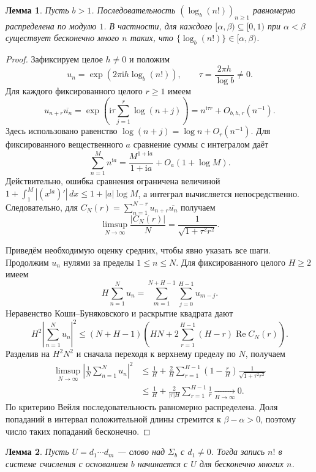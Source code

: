 \documentclass[a4paper,14pt]{extreport}
\theoremstyle{plain}
\newtheorem{lemma}{Лемма}[section]
\theoremstyle{definition}
\theoremstyle{remark}
\begin{document}
\begin{lemma}\label{lem:logfact}
Пусть $b>1$. Последовательность $(\log_b(n!))_{n\ge1}$
равномерно распределена по модулю $1$. В частности, для каждого
$[\alpha,\beta)\subseteq[0,1)$ при $\alpha<\beta$ существует
бесконечно много $n$ таких, что
$\{\log_b(n!)\}\in[\alpha,\beta)$.
\end{lemma}
\begin{proof}
Зафиксируем целое $h\ne0$ и положим
\[
 u_n=\exp(2\pi\mathrm i h\log_b(n!)),\qquad
 \tau=\frac{2\pi h}{\log b}\ne0.
\]
Для каждого фиксированного целого $r\ge1$ имеем
\[
 u_{n+r}\overline{u_n}
 =\exp\left(\mathrm i\tau\sum_{j=1}^r\log(n+j)\right)
 =n^{\mathrm i\tau r}+O_{b,h,r}(n^{-1}).
\]
Здесь использовано равенство
$\log(n+j)=\log n+O_r(n^{-1})$.
Для фиксированного вещественного $a$ сравнение суммы с интегралом даёт
\[
 \sum_{n=1}^M n^{\mathrm i a}
 =\frac{M^{1+\mathrm i a}}{1+\mathrm i a}+O_a(1+\log M).
\]
Действительно, ошибка сравнения ограничена величиной
$1+\int_1^M |(x^{\mathrm i a})'|\,dx
\le1+|a|\log M$, а интеграл вычисляется непосредственно.
Следовательно, для
$C_N(r)=\sum_{n=1}^{N-r}u_{n+r}\overline{u_n}$ получаем
\[
 \limsup_{N\to\infty}\frac{|C_N(r)|}{N}
 =\frac1{\sqrt{1+\tau^2r^2}}.
\]

Приведём необходимую оценку средних, чтобы явно указать все шаги.
Продолжим $u_n$ нулями за пределы $1\le n\le N$.
Для фиксированного целого $H\ge2$ имеем
\[
 H\sum_{n=1}^N u_n
 =\sum_{m=1}^{N+H-1}\sum_{j=0}^{H-1}u_{m-j}.
\]
Неравенство Коши--Буняковского и раскрытие квадрата дают
\[
 H^2\left|\sum_{n=1}^N u_n\right|^2
 \le (N+H-1)\left(
 HN+2\sum_{r=1}^{H-1}(H-r)\operatorname{Re}C_N(r)\right).
\]
Разделив на $H^2N^2$ и сначала переходя к верхнему пределу по $N$,
получаем
\[
\begin{aligned}
 \limsup_{N\to\infty}
 \left|\frac1N\sum_{n=1}^N u_n\right|^2
 &\le \frac1H+
 \frac2H\sum_{r=1}^{H-1}
 \left(1-\frac rH\right)\frac1{\sqrt{1+\tau^2r^2}}\\
 &\le \frac1H+\frac{2}{|\tau|H}\sum_{r=1}^{H-1}\frac1r
 \xrightarrow[H\to\infty]{}0.
\end{aligned}
\]
По критерию Вейля последовательность равномерно распределена.
Доля попаданий в интервал положительной длины стремится к
$\beta-\alpha>0$, поэтому число таких попаданий бесконечно.
\end{proof}

\begin{lemma}\label{lem:lead}
	Пусть $U=d_1\cdots d_m$ --- слово над $\Sigma_b$ с $d_1\ne0$. Тогда запись $n!$ в системе счисления с основанием $b$ начинается с $U$ для бесконечно многих $n$.
\end{lemma}
\end{document}
